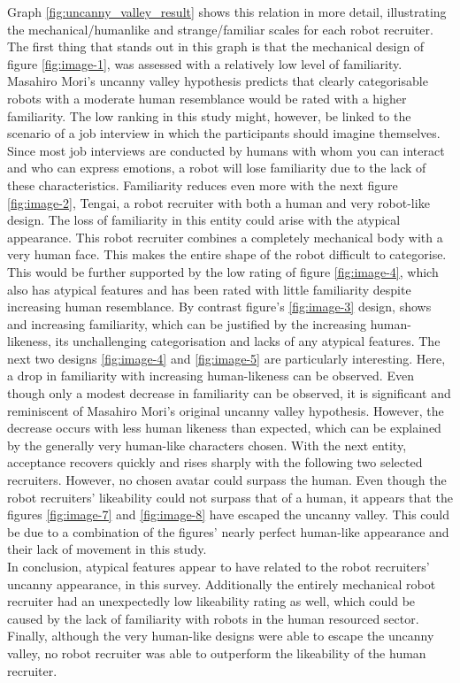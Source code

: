 Graph \ref{fig:uncanny_valley_result} shows this relation in more detail, illustrating the mechanical/humanlike and strange/familiar scales for each robot recruiter. The first thing that stands out in this graph is that the mechanical design of figure \ref{fig:image-1}, was assessed with a relatively low level of familiarity. Masahiro Mori's uncanny valley hypothesis predicts that clearly categorisable robots with a moderate human resemblance would be rated with a higher familiarity. The low ranking in this study might, however, be linked to the scenario of a job interview in which the participants should imagine themselves. Since most job interviews are conducted by humans with whom you can interact and who can express emotions, a robot will lose familiarity due to the lack of these characteristics. Familiarity reduces even more with the next figure \ref{fig:image-2}, Tengai, a robot recruiter with both a human and very robot-like design. The loss of familiarity in this entity could arise with the atypical appearance. This robot recruiter combines a completely mechanical body with a very human face. This makes the entire shape of the robot difficult to categorise. This would be further supported by the low rating of figure \ref{fig:image-4}, which also has atypical features and has been rated with little familiarity despite increasing human resemblance. By contrast figure's \ref{fig:image-3} design, shows and increasing familiarity, which can be justified by the increasing human-likeness, its unchallenging categorisation and lacks of any atypical features. The next two designs \ref{fig:image-4} and \ref{fig:image-5} are particularly interesting. Here, a drop in familiarity with increasing human-likeness can be observed. Even though only a modest decrease in familiarity can be observed, it is significant and reminiscent of Masahiro Mori's original uncanny valley hypothesis. However, the decrease occurs with less human likeness than expected, which can be explained by the generally very human-like characters chosen. With the next entity, acceptance recovers quickly and rises sharply with the following two selected recruiters. However, no chosen avatar could surpass the human. Even though the robot recruiters' likeability could not surpass that of a human, it appears that the figures \ref{fig:image-7} and \ref{fig:image-8} have escaped the uncanny valley. This could be due to a combination of the figures' nearly perfect human-like appearance and their lack of movement in this study.\\
In conclusion, atypical features appear to have related to the robot recruiters' uncanny appearance, in this survey. Additionally the entirely mechanical robot recruiter had an unexpectedly low likeability rating as well, which could be caused by the lack of familiarity with robots in the human resourced sector. Finally, although the very human-like designs were able to escape the uncanny valley, no robot recruiter was able to outperform the likeability of the human recruiter.\\
